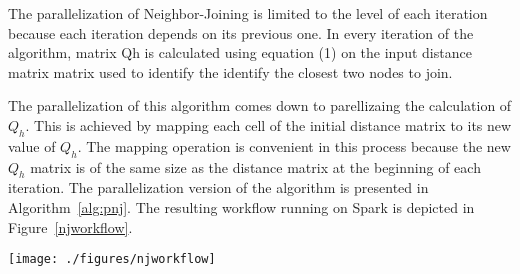 The parallelization of Neighbor-Joining is limited to the level of each iteration because each iteration depends on its previous one. In every iteration of the algorithm, matrix Qh is calculated using equation (1) on the input distance matrix matrix used to identify the identify the closest two nodes to join. 

The parallelization of this algorithm comes down to parellizaing the calculation of $Q_{h}$. This is achieved by mapping each cell of the initial distance matrix to its new value of $Q_{h}$. The mapping operation is convenient in this process because the new $Q_{h}$  matrix is of the same size as the distance matrix at the beginning of each iteration. The parallelization version of the algorithm is presented in Algorithm~\ref{alg:pnj}. The resulting workflow running on Spark is depicted in Figure~\ref{njworkflow}.

\begin{figure*}
	\begin{center}
	\texttt{[image: ./figures/njworkflow]}
	\caption{The neighbor-ioining parallel workflow with 4 main stages through every iteration}
	\label{njworkflow}
	\end{center}
\end{figure*}

